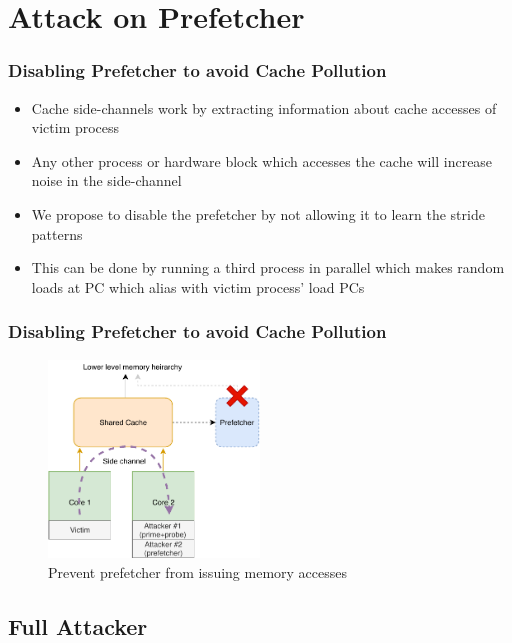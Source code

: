\documentclass[10pt]{beamer}
\begin{document}
\section{Attack on Prefetcher}

\begin{frame}
\frametitle{Disabling Prefetcher to avoid Cache Pollution}
\begin{itemize}
    \item Cache side-channels work by extracting information about cache
        accesses of victim process
    \item Any other process or hardware block which accesses the cache will
        increase noise in the side-channel
    \item We propose to disable the prefetcher by not allowing it to learn the stride patterns
    \item This can be done by running a third process in parallel which makes
        random loads at PC which alias with victim process' load PCs
\end{itemize}
\end{frame}

\begin{frame}
\frametitle{Disabling Prefetcher to avoid Cache Pollution}
\begin{figure}[ht]
    \centering
    \includegraphics[width=0.5\textwidth]{prefetch_attack}
    \caption{Prevent prefetcher from issuing memory accesses}
    \label{fig:prefetch_attack}
\end{figure}
\end{frame}

\subsection{Full Attacker}
\end{document}
